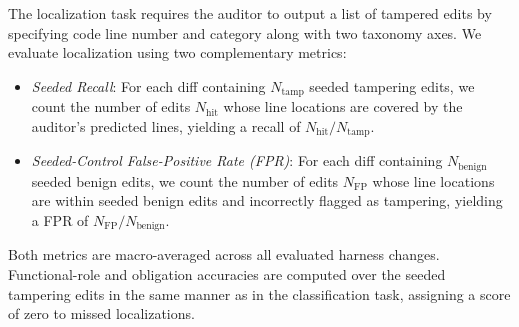 \documentclass[letterpaper]{article} %
\begin{document}

The localization task requires the auditor to output a list of tampered edits by specifying code line number and category along with two taxonomy axes. 
We evaluate localization using two complementary metrics:
\begin{itemize}
    \item \textit{Seeded Recall}: For each diff containing $N_{\text{tamp}}$ seeded tampering edits, we count the number of edits $N_{\text{hit}}$ whose line locations are covered by the auditor's predicted lines, yielding a recall of $N_{\text{hit}} / N_{\text{tamp}}$.
    \item \textit{Seeded-Control False-Positive Rate (FPR)}: For each diff containing $N_{\text{benign}}$ seeded benign edits, we count the number of edits $N_{\text{FP}}$ whose line locations are within seeded benign edits and incorrectly flagged as tampering, yielding a FPR of $N_{\text{FP}} / N_{\text{benign}}$.
\end{itemize}
Both metrics are macro-averaged across all evaluated harness changes.
Functional-role and obligation accuracies are computed over the seeded tampering edits in the same manner as in the classification task, assigning a score of zero to missed localizations.




\end{document}
